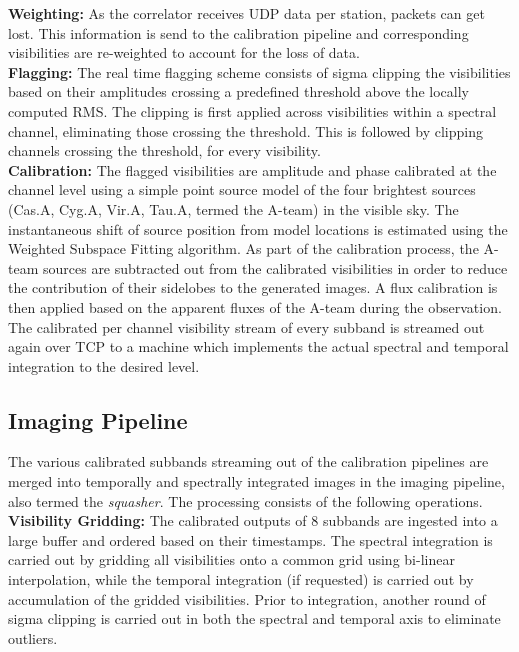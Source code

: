 \documentclass{ws-jai}
\begin{document}
\noindent \textbf {Weighting:} As the  correlator receives UDP data per station,
packets can get  lost. This information is send to  the calibration pipeline and
corresponding visibilities are re-weighted to account for the loss of data. \\

\noindent \textbf  {Flagging:} The  real time flagging  scheme consists  of sigma
clipping  the  visibilities based  on  their  amplitudes crossing  a  predefined
threshold above the  locally computed RMS. The clipping is  first applied across
visibilities  within   a  spectral  channel,  eliminating   those  crossing  the
threshold. This  is followed  by clipping channels  crossing the  threshold, for
every visibility.\\


\noindent  \textbf {Calibration:}  The  flagged visibilities  are amplitude  and
phase calibrated at the  channel level using a simple point  source model of the
four brightest  sources (Cas.A, Cyg.A, Vir.A,  Tau.A, termed the A-team)  in the
visible sky. The instantaneous shift of  source position from model locations is
estimated  using  the  Weighted Subspace  Fitting  \citep  {viberg1991detection}
algorithm. As part of the calibration process, the A-team sources are subtracted
out from  the calibrated  visibilities in  order to  reduce the  contribution of
their sidelobes  to the  generated images.  A flux  calibration is  then applied
based  on  the  apparent  fluxes  of the  A-team  during  the  observation.  The
calibrated per channel visibility stream of  every subband is streamed out again
over  TCP  to a  machine  which  implements  the  actual spectral  and  temporal
integration to the desired level.\\

\subsection{Imaging Pipeline} 
The various calibrated  subbands streaming out of the  calibration pipelines are
merged into temporally and spectrally integrated images in the imaging pipeline,
also termed  the \textit  {squasher}. The processing  consists of  the following
operations.\\

\noindent \textbf  {Visibility Gridding:} The  calibrated outputs of  8 subbands
are ingested  into a large  buffer and ordered  based on their  timestamps.  The
spectral integration is  carried out by gridding all visibilities  onto a common
grid using bi-linear interpolation, while the temporal integration (if requested)
is  carried  out   by  accumulation  of  the  gridded   visibilities.  Prior  to
integration, another round of sigma clipping is carried out in both the spectral
and temporal axis to eliminate outliers.\\
\end{document}
